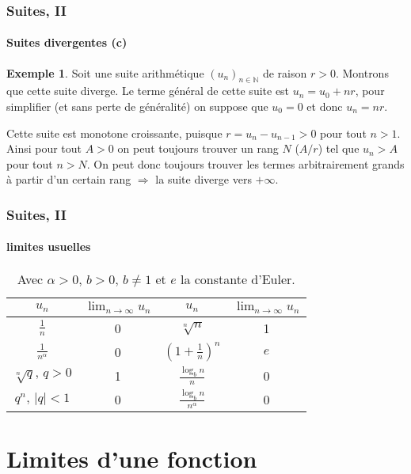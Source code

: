 \documentclass[10pt,notheorems]{beamer}
\theoremstyle{plain}
\theoremstyle{definition} %
\newtheorem{example}{Exemple}
\begin{document}
\begin{frame}
  \frametitle{Suites, II}
  \framesubtitle{Suites divergentes (c)}
  \hypertarget{slide_suite_divergente_3}{}

  \bigskip

  \begin{example}

    Soit une suite arithmétique $(u_n)_{n\in\mathbb N}$ de raison
    $r>0$. Montrons que cette suite diverge. Le terme général de cette
    suite est $u_n = u_0+nr$, pour simplifier (et sans perte de
    généralité) on suppose que $u_0=0$ et donc $u_n=nr$.\newline

    Cette suite est monotone croissante, puisque $r=u_n-u_{n-1}>0$
    pour tout $n>1$. Ainsi pour tout $A>0$ on peut toujours trouver un
    rang $N$ ($A/r$) tel que $u_n>A$ pour tout $n>N$. On peut donc
    toujours trouver les termes arbitrairement grands à partir d'un
    certain rang $\Rightarrow$ la suite diverge vers $+\infty$.

  \end{example}

\end{frame}


\begin{frame}
  \frametitle{Suites, II}
  \framesubtitle{limites usuelles}
  \hypertarget{slide_suite_limites_usuelles}{}

  \begin{table}
    \centering
    \begin{tabular}{c|c||c|c}
      $u_n$ & $\lim_{n\rightarrow\infty}u_n$ & $u_n$ & $\lim_{n\rightarrow\infty}u_n$\\\hline
      $\frac{1}{n}$ & 0 & $\sqrt[n]{n}$ & 1\\
      $\frac{1}{n^{\alpha}}$ & 0 & $\left(1+\frac{1}{n}\right)^n$ & $e$\\
      $\sqrt[n]{q},\,q>0$ & 1 & $\frac{\log_b n}{n}$ & 0\\
      $q^n,\,|q|<1$ & 0 & $\frac{\log_b n}{n^\alpha}$ & 0\\
    \end{tabular}
    \caption{Avec $\alpha>0$, $b>0$, $b\neq 1$ et $e$ la constante d'Euler.}
  \end{table}

\end{frame}


\section{Limites d'une fonction}
\end{document}
